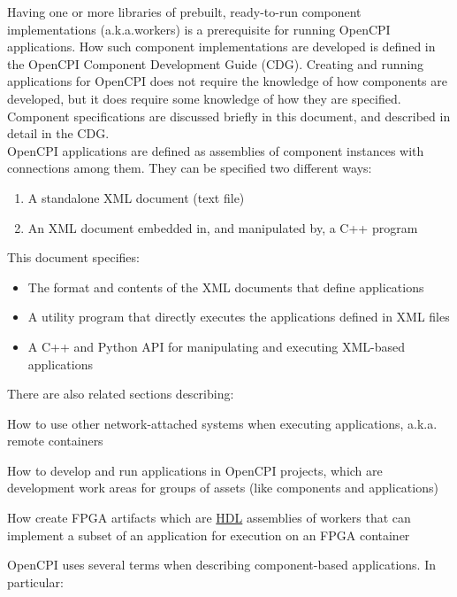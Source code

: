 \documentclass[10pt, a4paper, oneside]{article}
\renewcommand\_{\textunderscore\allowbreak} %
\begin{document}
Having one or more libraries of prebuilt, ready-to-run component implementations (a.k.a.workers) is a prerequisite for running OpenCPI applications. How such component implementations are developed is defined in the OpenCPI Component Development Guide (CDG).  Creating and running applications for OpenCPI does not require the knowledge of how components are developed, but it does require some knowledge of how they are specified.  Component specifications are discussed briefly in this document, and described in detail in the CDG. \\
OpenCPI applications are defined as assemblies of component instances with connections among them.  They can be specified two different ways:
\begin{enumerate}
	\item A standalone XML document (text file)
	\item An XML document embedded in, and manipulated by, a C++ program
\end{enumerate}
This document specifies:
\begin{itemize}
	\item The format and contents of the XML documents that define applications
	\item A utility program that directly executes the applications defined in XML files
	\item A C++ and Python API for manipulating and executing XML-based applications
\end{itemize}
There are also related sections describing:
\begin{description}
\item {How to use other network-attached systems when executing applications, a.k.a. remote containers}
\item {How to develop and run applications in OpenCPI projects, which are development work areas for groups of assets (like components and applications)}
\item {How create FPGA artifacts which are \hyperlink{HDL}{HDL} assemblies of workers that can implement a subset of an application for execution on an FPGA container}
\end{description}
OpenCPI uses several terms when describing component-based applications. In particular:
\end{document}
